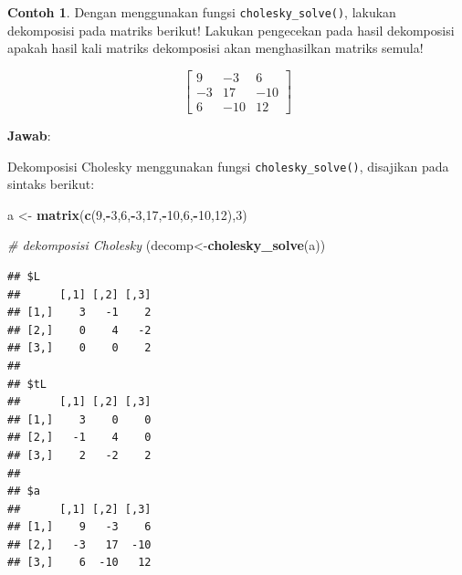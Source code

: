 \documentclass[
]{book}
\newenvironment{Shaded}{\begin{snugshade}}{\end{snugshade}}
\newcommand{\CommentTok}[1]{\textcolor[rgb]{0.56,0.35,0.01}{\textit{#1}}}
\newcommand{\DecValTok}[1]{\textcolor[rgb]{0.00,0.00,0.81}{#1}}
\newcommand{\FunctionTok}[1]{\textcolor[rgb]{0.13,0.29,0.53}{\textbf{#1}}}
\newcommand{\NormalTok}[1]{#1}
\newcommand{\OtherTok}[1]{\textcolor[rgb]{0.56,0.35,0.01}{#1}}
\newcommand{\SpecialCharTok}[1]{\textcolor[rgb]{0.81,0.36,0.00}{\textbf{#1}}}
\theoremstyle{definition}
\theoremstyle{definition}
\newtheorem{example}{Contoh}[chapter]
\theoremstyle{definition}
\theoremstyle{definition}
\theoremstyle{remark}
\begin{document}
\begin{example}
\protect\hypertarget{exm:cholexm2}{}\label{exm:cholexm2}Dengan menggunakan fungsi \texttt{cholesky\_solve()}, lakukan dekomposisi pada matriks berikut! Lakukan pengecekan pada hasil dekomposisi apakah hasil kali matriks dekomposisi akan menghasilkan matriks semula!
\end{example}

\[
\begin{bmatrix}
     9         & -3       & 6                  \\[0.3em]
     -3         & 17       & -10                   \\[0.3em]
     6         & -10      & 12                  
\end{bmatrix}
\]

\textbf{Jawab}:

Dekomposisi Cholesky menggunakan fungsi \texttt{cholesky\_solve()}, disajikan pada sintaks berikut:

\begin{Shaded}
\begin{Highlighting}[]
\NormalTok{a }\OtherTok{\textless{}{-}} \FunctionTok{matrix}\NormalTok{(}\FunctionTok{c}\NormalTok{(}\DecValTok{9}\NormalTok{,}\SpecialCharTok{{-}}\DecValTok{3}\NormalTok{,}\DecValTok{6}\NormalTok{,}\SpecialCharTok{{-}}\DecValTok{3}\NormalTok{,}\DecValTok{17}\NormalTok{,}\SpecialCharTok{{-}}\DecValTok{10}\NormalTok{,}\DecValTok{6}\NormalTok{,}\SpecialCharTok{{-}}\DecValTok{10}\NormalTok{,}\DecValTok{12}\NormalTok{),}\DecValTok{3}\NormalTok{)}

\CommentTok{\# dekomposisi Cholesky}
\NormalTok{(decomp}\OtherTok{\textless{}{-}}\FunctionTok{cholesky\_solve}\NormalTok{(a))}
\end{Highlighting}
\end{Shaded}

\begin{verbatim}
## $L
##      [,1] [,2] [,3]
## [1,]    3   -1    2
## [2,]    0    4   -2
## [3,]    0    0    2
## 
## $tL
##      [,1] [,2] [,3]
## [1,]    3    0    0
## [2,]   -1    4    0
## [3,]    2   -2    2
## 
## $a
##      [,1] [,2] [,3]
## [1,]    9   -3    6
## [2,]   -3   17  -10
## [3,]    6  -10   12
\end{verbatim}

\begin{Shaded}
\end{Shaded}
\end{document}
